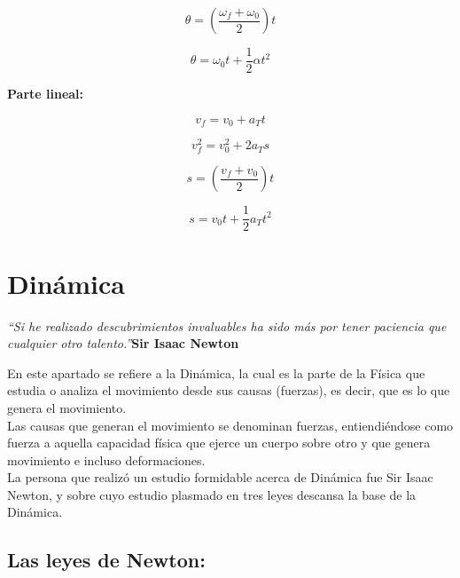 \documentclass[a5paper,pagesize,10pt,bibtotoc,pointlessnumbers,
normalheadings,DIV=9,fleqn,x11names,table,twoside=false]{scrbook}
\begin{document}
\begin{equation}
\theta = (\frac{\omega_f + \omega_0}{2})t
\end{equation}

\begin{equation}
\theta = \omega_0t+\frac{1}{2}\alpha t^2
\end{equation}

\textbf{Parte lineal:}

\begin{equation}
v_f = v_0 + a_Tt
\end{equation}

\begin{equation}
v_f^2 = v_0^2 +2a_Ts
\end{equation}

\begin{equation}
s = (\frac{v_f + v_0}{2})t
\end{equation}

\begin{equation}
s = v_0t+\frac{1}{2}a_Tt^2
\end{equation}

\chapter{Dinámica}

\textit{``Si he realizado descubrimientos invaluables ha sido más por tener paciencia que cualquier otro talento.''}\textbf{Sir 
Isaac Newton}
\vspace{1.0cm}

En este apartado se refiere a la Dinámica, la cual es la parte de la Física que estudia o analiza el movimiento desde sus causas 
(fuerzas), es decir, que es lo que genera el movimiento.\\

Las causas que generan el movimiento se denominan fuerzas, entiendiéndose como fuerza a aquella capacidad física que ejerce un 
cuerpo sobre otro y que genera movimiento e incluso deformaciones.\\

La persona que realizó un estudio formidable acerca de Dinámica fue Sir Isaac Newton, y sobre cuyo estudio plasmado en tres leyes 
descansa la base de la Dinámica.
 
\section{Las leyes de Newton:}
\end{document}
